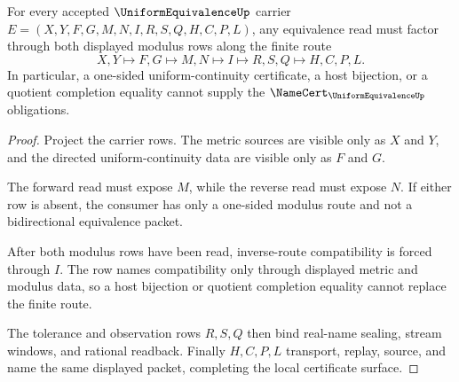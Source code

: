 \begin{theorem}
\label{thm:uniform-equivalence-bidirectional-modulus}
For every accepted $\UniformEquivalenceUp$ carrier $E=(X,Y,F,G,M,N,I,R,S,Q,H,C,P,L)$, any equivalence read must factor through both displayed modulus rows along the finite route
$$
X,Y\longmapsto F,G\longmapsto M,N\longmapsto I\longmapsto R,S,Q\longmapsto H,C,P,L .
$$
In particular, a one-sided uniform-continuity certificate, a host bijection, or a quotient completion equality cannot supply the $\NameCert_{\UniformEquivalenceUp}$ obligations.
\end{theorem}
\begin{proof}
Project the carrier rows. The metric sources are visible only as $X$ and $Y$, and the directed uniform-continuity data are visible only as $F$ and $G$.

The forward read must expose $M$, while the reverse read must expose $N$. If either row is absent, the consumer has only a one-sided modulus route and not a bidirectional equivalence packet.

After both modulus rows have been read, inverse-route compatibility is forced through $I$. The row names compatibility only through displayed metric and modulus data, so a host bijection or quotient completion equality cannot replace the finite route.

The tolerance and observation rows $R,S,Q$ then bind real-name sealing, stream windows, and rational readback. Finally $H,C,P,L$ transport, replay, source, and name the same displayed packet, completing the local certificate surface.
\end{proof}

